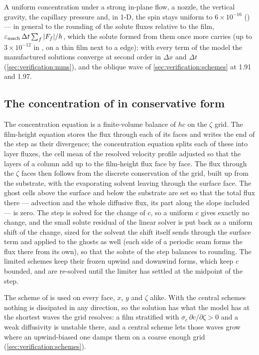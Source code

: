 A uniform concentration under a strong in-plane flow, a nozzle, the vertical
gravity, the capillary pressure and, in 1-D, the spin stays uniform to
$6\times10^{-16}$ () --- in general to the rounding of
the solute fluxes relative to the film, $\varepsilon_{\mathrm{mach}}\,\Delta t\sum_f|F_f|/h$,
which the solute formed from them once more carries (up to $3\times10^{-12}$
in , on a thin film next to a  edge); with every term of the model the
manufactured solutions converge at second order in $\Delta x$ and $\Delta t$
(\cref{sec:verification:mms}), and the oblique wave of
\cref{sec:verification:schemes} at 1.91 and 1.97.

\subsection{The concentration of \texorpdfstring{}{CZ} in conservative form}
\label{sec:disc:cz-conservative}

The  concentration equation is a finite-volume balance of $hc$ on
the $\zeta$ grid. The film-height equation stores the flux through each of
its faces and writes the end of the step as their divergence; the
concentration equation splits each of these into layer fluxes, the cell mean
of the resolved velocity profile adjusted so that the layers of a column add
up to the film-height flux face by face. The flux through the $\zeta$ faces
then follows from the discrete conservation of the grid, built up from the
substrate, with the evaporating solvent leaving through the surface face.
The ghost cells above the surface and below the substrate are set so that
the total flux there --- advection and the whole diffusive flux, its part
along the slope included --- is zero. The step is solved for the change of
$c$, so a uniform $c$ gives exactly no change, and the small solute residual
of the linear solver is put back as a uniform shift of the change, sized for
the solvent the shift itself sends through the surface term and applied to
the ghosts as well (each side of a periodic seam forms the flux there from
its own), so that the solute of the step balances to rounding. The limited schemes keep
their frozen upwind and downwind forms, which keep $c$ bounded, and are
re-solved until the limiter has settled at the midpoint of the step.

The scheme of  is used on every face,
$x$, $y$ and $\zeta$ alike. With the central schemes nothing is dissipated in
any direction, so the solution has what the model has at the shortest waves
the grid resolves: a film stratified with $\sigma_c\,\partial c/\partial\zeta
> 0$ and a weak diffusivity is unstable there, and a central scheme lets
those waves grow where an upwind-biased one damps them on a coarse enough
grid (\cref{sec:verification:schemes}).
